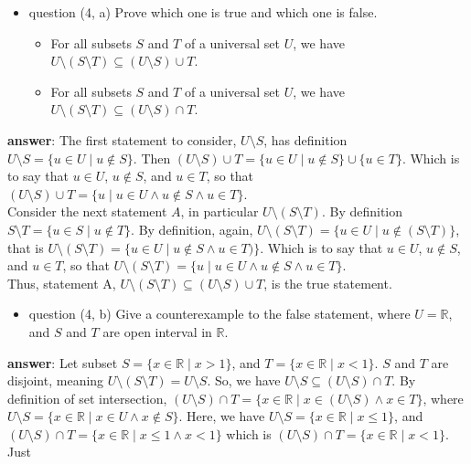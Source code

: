 \documentclass[12pt]{article}
\newcommand\Real{\mathbb{R}}
\newcommand\sube{\subseteq}
\begin{document}
\begin{itemize}
\item question (4, a) Prove which one is true and which one is false.
\begin{itemize}
\item For all subsets \(S\) and \(T\) of a universal set \(U\), we have \(U\setminus(S\setminus{}T)\sube(U\setminus{}S)\cup{}T\).
\item For all subsets \(S\) and \(T\) of a universal set \(U\), we have \(U\setminus(S\setminus{}T)\sube(U\setminus{}S)\cap{}T\).
\end{itemize}
\end{itemize}
\textbf{answer}: The first statement to consider, \(U\setminus{}S\), has definition
\(U\setminus{}S=\{u\in{}U\mid{}u\notin{}S\}\). Then \((U\setminus{}S)\cup{}T=\{u\in{}U\mid{}u\notin{}S\}\cup\{u\in{}T\}\). Which is to say
that \(u\in{}U\), \(u\notin{}S\), and \(u\in{}T\), so that \((U\setminus{}S)\cup{}T=\{u\mid{}u\in{}U\land{}u\notin{}S\land{}u\in{}T\}\). \\
Consider the next statement \(A\), in particular \(U\setminus(S\setminus{}T)\). By definition
\(S\setminus{}T=\{u\in{}S\mid{}u\notin{}T\}\). By definition, again, \(U\setminus{}(S\setminus{}T)=\{u\in{}U\mid{}u\notin{}(S\setminus{}T)\}\),
that is \(U\setminus{}(S\setminus{}T)=\{u\in{}U\mid{}u\notin{}S\land{}u\in{}T)\}\). Which is to say that \(u\in{}U\), \(u\notin{}S\), and
\(u\in{}T\), so that \(U\setminus{}(S\setminus{}T)=\{u\mid{}u\in{}U\land{}u\notin{}S\land{}u\in{}T\}\). \\
Thus, statement A, \(U\setminus(S\setminus{}T)\sube(U\setminus{}S)\cup{}T\), is the true statement.
\begin{itemize}
\item question (4, b) Give a counterexample to the false statement, where \(U=\Real\),
and \(S\) and \(T\) are open interval in \(\Real\).
\end{itemize}
\textbf{answer}: Let subset \(S=\{x\in\Real\mid{}x>1\}\), and \(T=\{x\in\Real\mid{}x<1\}\). \(S\)
and \(T\) are disjoint, meaning \(U\setminus{}(S\setminus{}T)=U\setminus{}S\). So, we have \(U\setminus{}S\sube{}(U\setminus{}S)\cap{}T\). By
definition of set intersection, \((U\setminus{}S)\cap{}T=\{x\in\Real\mid{}x\in{}(U\setminus{}S)\land{}x\in{}T\}\), where
\(U\setminus{}S=\{x\in\Real\mid{}x\in{}U\land{}x\notin{}S\}\). Here, we have \(U\setminus{}S=\{x\in\Real\mid{}x\le{}1\}\), and
\((U\setminus{}S)\cap{}T=\{x\in\Real\mid{}x\le1\land{}x<1\}\) which is \((U\setminus{}S)\cap{}T=\{x\in\Real\mid{}x<1\}\). Just
\end{document}
